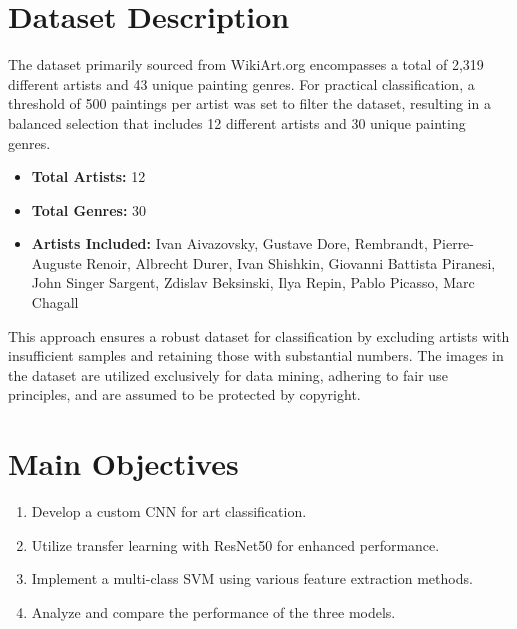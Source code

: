 \documentclass[a0,portrait]{a0poster}
\begin{document}
\begin{multicols}{2}
\section*{Dataset Description}

The dataset primarily sourced from WikiArt.org encompasses a total of 2,319 different artists and 43 unique painting genres. For practical classification, a threshold of 500 paintings per artist was set to filter the dataset, resulting in a balanced selection that includes 12 different artists and 30 unique painting genres.

\begin{itemize}
\item \textbf{Total Artists:} 12
\item \textbf{Total Genres:} 30
\item \textbf{Artists Included:} Ivan Aivazovsky, Gustave Dore, Rembrandt, Pierre-Auguste Renoir, Albrecht Durer, Ivan Shishkin, Giovanni Battista Piranesi, John Singer Sargent, Zdislav Beksinski, Ilya Repin, Pablo Picasso, Marc Chagall
\end{itemize}

This approach ensures a robust dataset for classification by excluding artists with insufficient samples and retaining those with substantial numbers. The images in the dataset are utilized exclusively for data mining, adhering to fair use principles, and are assumed to be protected by copyright.


\color{DarkSlateGray} %

\section*{Main Objectives}
\begin{enumerate}
\item Develop a custom CNN for art classification.
\item Utilize transfer learning with ResNet50 for enhanced performance.
\item Implement a multi-class SVM using various feature extraction methods.
\item Analyze and compare the performance of the three models.
\end{enumerate}


\end{multicols}
\end{document}
